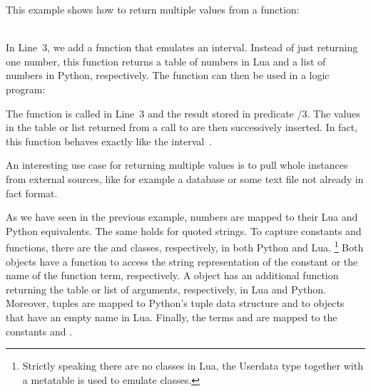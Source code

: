 \begin{example}
This example shows how to return multiple values from a function:
\\[-8pt] %
\begin{minipage}[t]{0.53\textwidth}

\end{minipage}
\begin{minipage}[t]{0.49\textwidth}

\end{minipage}\\
In Line~3, we add a function that emulates an interval.
Instead of just returning one number,
this function returns a table of numbers in Lua and a list of numbers in Python, respectively.
The  function can then be used in a logic program:%
%

%
The function is called in Line~3 and the result stored in predicate /$3$.
The values in the table or list returned from a call to  are then successively inserted.
In fact, this function behaves exactly like the interval~.

An interesting use case for returning multiple values is to pull whole
instances from external sources, like for example a database or some text file not already in fact format.
\end{example}

As we have seen in the previous example,
numbers are mapped to their Lua and Python equivalents.
The same holds for quoted strings.
To capture constants and functions,
there are the  and  classes, respectively, in both Python and Lua.%
\footnote{Strictly speaking there are no classes in Lua, the Userdata type together with a metatable is used to emulate classes.}
Both objects have a function  to access the string representation of the constant or the name of the function term, respectively.
A  object has an additional function  returning the table or list of arguments, respectively, in Lua and Python.
Moreover,
tuples are mapped to Python's tuple data structure and to  objects
that have an empty name in Lua.
Finally, the terms  and  are mapped to the constants  and .

